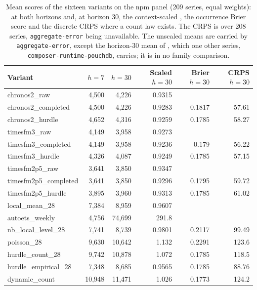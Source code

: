 \begin{table}[htbp]
\centering\footnotesize\setlength{\tabcolsep}{3.5pt}
\caption{Mean scores of the sixteen variants on the npm panel (209 series, equal weights): \qs{} at both
horizons and, at horizon 30, the context-scaled \qs{}, the occurrence Brier score and the discrete CRPS
where a count law exists. The CRPS is over 208 series, \texttt{aggregate-error} being unavailable. The
unscaled means are carried by \texttt{aggregate-error}, except the horizon-30 mean of \aets{}, which one
other series, \texttt{composer-runtime-pouchdb}, carries; it is in no family comparison.}
\label{tab:s2scores}
\begin{tabular}{lrrrrr}
\toprule
Variant & \qs{} $h = 7$ & \qs{} $h = 30$ & Scaled \qs{} $h = 30$ & Brier $h = 30$ & CRPS $h = 30$ \\
\midrule
chronos2\_raw & 4,500 & 4,226 & 0.9315 &  &  \\
chronos2\_completed & 4,500 & 4,226 & 0.9283 & 0.1817 & 57.61 \\
chronos2\_hurdle & 4,652 & 4,316 & 0.9259 & 0.1785 & 58.27 \\
timesfm3\_raw & 4,149 & 3,958 & 0.9273 &  &  \\
timesfm3\_completed & 4,149 & 3,958 & 0.9236 & 0.179 & 56.22 \\
timesfm3\_hurdle & 4,326 & 4,087 & 0.9249 & 0.1785 & 57.15 \\
timesfm2p5\_raw & 3,641 & 3,850 & 0.9347 &  &  \\
timesfm2p5\_completed & 3,641 & 3,850 & 0.9296 & 0.1795 & 59.72 \\
timesfm2p5\_hurdle & 3,895 & 3,960 & 0.9313 & 0.1785 & 61.02 \\
local\_mean\_28 & 7,384 & 8,959 & 0.9607 &  &  \\
autoets\_weekly & 4,756 & 74,699 & 291.8 &  &  \\
nb\_local\_level\_28 & 7,741 & 8,739 & 0.9801 & 0.2117 & 99.49 \\
poisson\_28 & 9,630 & 10,642 & 1.132 & 0.2291 & 123.6 \\
hurdle\_count\_28 & 9,742 & 10,878 & 1.072 & 0.1785 & 118.5 \\
hurdle\_empirical\_28 & 7,348 & 8,685 & 0.9565 & 0.1785 & 88.76 \\
dynamic\_count & 10,948 & 11,471 & 1.026 & 0.1773 & 124.2 \\
\bottomrule
\end{tabular}
\end{table}

